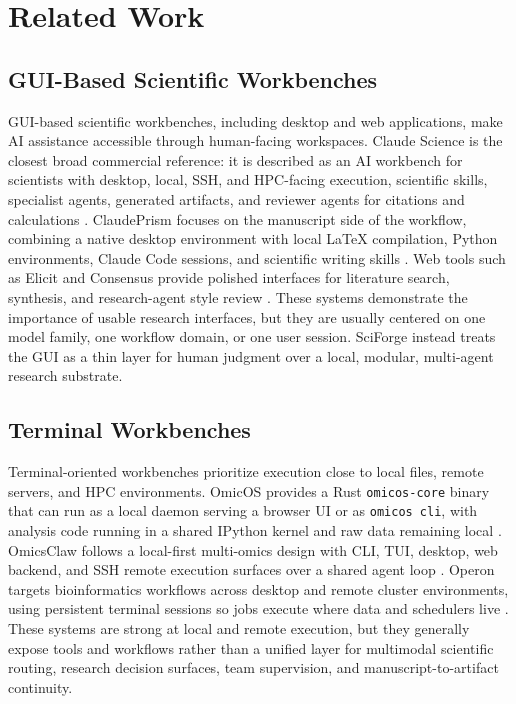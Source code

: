 \documentclass[sn-basic,Numbered,pdflatex]{sn-jnl}
\begin{document}
\section{Related Work}

\subsection{GUI-Based Scientific Workbenches}

GUI-based scientific workbenches, including desktop and web applications, make AI assistance accessible through human-facing workspaces. Claude Science is the closest broad commercial reference: it is described as an AI workbench for scientists with desktop, local, SSH, and HPC-facing execution, scientific skills, specialist agents, generated artifacts, and reviewer agents for citations and calculations \cite{anthropicClaudeScience2026}. ClaudePrism focuses on the manuscript side of the workflow, combining a native desktop environment with local LaTeX compilation, Python environments, Claude Code sessions, and scientific writing skills \cite{claudePrism2026}. Web tools such as Elicit and Consensus provide polished interfaces for literature search, synthesis, and research-agent style review \cite{elicit2026,consensus2026}. These systems demonstrate the importance of usable research interfaces, but they are usually centered on one model family, one workflow domain, or one user session. SciForge instead treats the GUI as a thin layer for human judgment over a local, modular, multi-agent research substrate.

\subsection{Terminal Workbenches}

Terminal-oriented workbenches prioritize execution close to local files, remote servers, and HPC environments. OmicOS provides a Rust \texttt{omicos-core} binary that can run as a local daemon serving a browser UI or as \texttt{omicos cli}, with analysis code running in a shared IPython kernel and raw data remaining local \cite{omicOSOverview2026,omicOSServe2026,omicOSCLI2026}. OmicsClaw follows a local-first multi-omics design with CLI, TUI, desktop, web backend, and SSH remote execution surfaces over a shared agent loop \cite{omicsClaw2026}. Operon targets bioinformatics workflows across desktop and remote cluster environments, using persistent terminal sessions so jobs execute where data and schedulers live \cite{operonGitHub2026}. These systems are strong at local and remote execution, but they generally expose tools and workflows rather than a unified layer for multimodal scientific routing, research decision surfaces, team supervision, and manuscript-to-artifact continuity.
\end{document}

